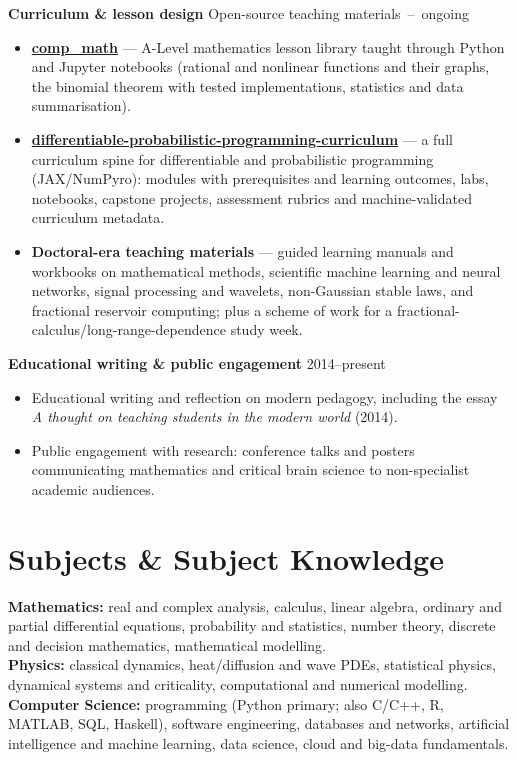 \documentclass[10pt,a4paper]{article}
\newcommand{\entry}[2]{{\textbf{#1}} \hfill {\small\color{muted}#2}\\[1pt]}
\begin{document}
\entry{Curriculum \& lesson design}{Open-source teaching materials \,--\, ongoing}
\begin{itemize}[leftmargin=1.3em,itemsep=1.5pt,topsep=2pt]
  \item \textbf{\href{https://github.com/dave2k77/comp_math}{comp\_math}} --- A-Level mathematics lesson library taught through Python and Jupyter notebooks (rational and nonlinear functions and their graphs, the binomial theorem with tested implementations, statistics and data summarisation).
  \item \textbf{\href{https://github.com/dave2k77/differentiable-probabilistic-programming-curriculum}{differentiable-probabilistic-programming-curriculum}} --- a full curriculum spine for differentiable and probabilistic programming (JAX/NumPyro): modules with prerequisites and learning outcomes, labs, notebooks, capstone projects, assessment rubrics and machine-validated curriculum metadata.
  \item \textbf{Doctoral-era teaching materials} --- guided learning manuals and workbooks on mathematical methods, scientific machine learning and neural networks, signal processing and wavelets, non-Gaussian stable laws, and fractional reservoir computing; plus a scheme of work for a fractional-calculus/long-range-dependence study week.
\end{itemize}

\entry{Educational writing \& public engagement}{2014--present}
\begin{itemize}[leftmargin=1.3em,itemsep=1.5pt,topsep=2pt]
  \item Educational writing and reflection on modern pedagogy, including the essay \emph{A thought on teaching students in the modern world} (2014).
  \item Public engagement with research: conference talks and posters communicating mathematics and critical brain science to non-specialist academic audiences.
\end{itemize}

\section{Subjects \& Subject Knowledge}
\textbf{Mathematics:} real and complex analysis, calculus, linear algebra, ordinary and partial differential equations, probability and statistics, number theory, discrete and decision mathematics, mathematical modelling.\\
\textbf{Physics:} classical dynamics, heat/diffusion and wave PDEs, statistical physics, dynamical systems and criticality, computational and numerical modelling.\\
\textbf{Computer Science:} programming (Python primary; also C/C++, R, MATLAB, SQL, Haskell), software engineering, databases and networks, artificial intelligence and machine learning, data science, cloud and big-data fundamentals.
\end{document}
